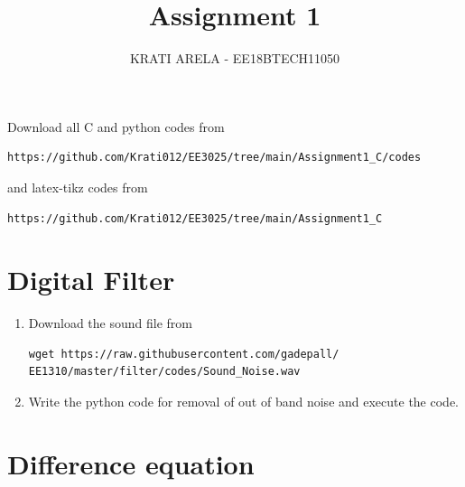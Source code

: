 \documentclass[journal,12pt,twocolumn]{IEEEtran}
\renewcommand\thesection{\arabic{section}}
\begin{document}
\def\putbox#1#2#3{\makebox[0in][l]{\makebox[#1][l]{}\raisebox{\baselineskip}[0in][0in]{\raisebox{#2}[0in][0in]{#3}}}}
     \def\rightbox#1{\makebox[0in][r]{#1}}
     \def\centbox#1{\makebox[0in]{#1}}
     \def\topbox#1{\raisebox{-\baselineskip}[0in][0in]{#1}}
     \def\midbox#1{\raisebox{-0.5\baselineskip}[0in][0in]{#1}}
\vspace{3cm}
\title{Assignment 1}
\author{KRATI ARELA - EE18BTECH11050}
\maketitle
\newpage
\renewcommand{\thefigure}{\theenumi}
\renewcommand{\thetable}{\theenumi}



Download all C and python codes from 
\begin{lstlisting}
https://github.com/Krati012/EE3025/tree/main/Assignment1_C/codes
\end{lstlisting}
and latex-tikz codes from 
\begin{lstlisting}
https://github.com/Krati012/EE3025/tree/main/Assignment1_C
\end{lstlisting}
\section{Digital Filter}
\begin{enumerate}[label=\thesection.\arabic*
,ref=\thesection.\theenumi]
\item
\label{prob:inp}
Download the sound file from  
\begin{lstlisting}
wget https://raw.githubusercontent.com/gadepall/ 
EE1310/master/filter/codes/Sound_Noise.wav
\end{lstlisting}

\item
\label{prob:out}
Write the python code for removal of out of band noise and execute the code.
\\
\solution

\end{enumerate}
\section{Difference equation}
\end{document}
